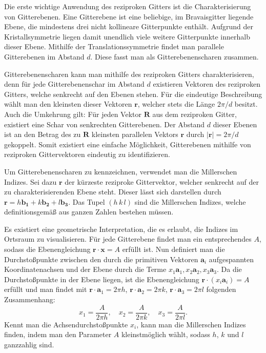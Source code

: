 Die erste wichtige Anwendung des reziproken Gitters ist die Charakterisierung von Gitterebenen.
Eine Gitterebene ist eine beliebige, im Bravaisgitter liegende Ebene, die mindestens drei nicht kollineare Gitterpunkte
enthält.
Aufgrund der Kristallsymmetrie liegen damit unendlich viele weitere Gitterpunkte innerhalb dieser Ebene.
Mithilfe der Translationssymmetrie findet man parallele Gitterebenen im Abstand $d$.
Diese fasst man als Gitterebenenscharen zusammen.

Gitterebenenscharen kann man mithilfe des reziproken Gitters charakterisieren, denn für jede
Gitterebenenschar im Abstand $d$ existieren Vektoren des reziproken Gitters, welche senkrecht auf den Ebenen stehen.
Für die eindeutige Beschreibung wählt man den kleinsten dieser Vektoren $\mathbf{r}$, welcher stets die Länge $2 \pi / d$
besitzt.
Auch die Umkehrung gilt: Für jeden Vektor $\mathbf{R}$ aus dem reziproken Gitter, existiert eine Schar von senkrechten
Gitterebenen.
Der Abstand $d$ dieser Ebenen ist an den Betrag des zu $\mathbf{R}$ kleinsten parallelen Vektors $\mathbf{r}$ durch
$\lvert \mathbf{r}\rvert=2\pi  /d$ gekoppelt.
Somit existiert eine einfache Möglichkeit, Gitterebenen mithilfe von reziproken Gittervektoren eindeutig zu
identifizieren.

Um Gitterebenenscharen zu kennzeichnen, verwendet man die Millerschen Indizes.
Sei dazu $\mathbf{r}$ der kürzeste reziproke Gittervektor, welcher senkrecht auf der zu charakterisierenden Ebene steht.
Dieser lässt sich darstellen durch $ \mathbf{r} = h \mathbf{b_1} + k \mathbf{b_2} + l \mathbf{b_3}$.
Das Tupel $(h\, k\,l)$ sind die Millerschen Indizes, welche definitionsgemäß aus ganzen Zahlen bestehen müssen.

Es existiert eine geometrische Interpretation, die es erlaubt, die Indizes im Ortsraum zu
visualisieren.
Für jede Gitterebene findet man ein entsprechendes $A$, sodass die Ebenengleichung $\mathbf{r} \cdot \mathbf{x} = A$
erfüllt ist.
Nun definiert man die Durchstoßpunkte zwischen den durch die primitiven Vektoren $\mathbf{a}_i$ aufgespannten
Koordinatenachsen und der Ebene durch die Terme $x_{1}\mathbf{a}_{1}, x_{2}\mathbf{a}_{2}, x_{3}\mathbf{a}_{3}$.
Da die Durchstoßpunkte in der Ebene liegen, ist die Ebenengleichung $\mathbf{r}\cdot(x_{i}\mathbf{a}_{i})=A$ erfüllt und
man findet mit $\mathbf{r}\cdot\mathbf{a}_{1}=2\pi h$, $\mathbf{r}\cdot \mathbf{a}_{2}=2\pi k$,
$ \mathbf{r}\cdot \mathbf{a}_{3}=2\pi l$ folgenden Zusammenhang:
\begin{equation}
    x_{1}=\frac{A}{2\pi h}, \quad x_{2}=\frac{A}{2\pi k}, \quad x_{3} =\frac{A}{2\pi l}.
\end{equation}
Kennt man die Achsendurchstoßpunkte $x_i$, kann man die Millerschen Indizes finden, indem man den Parameter $A$
kleinstmöglich wählt, sodass $h$, $k$ und $l$ ganzzahlig sind.

